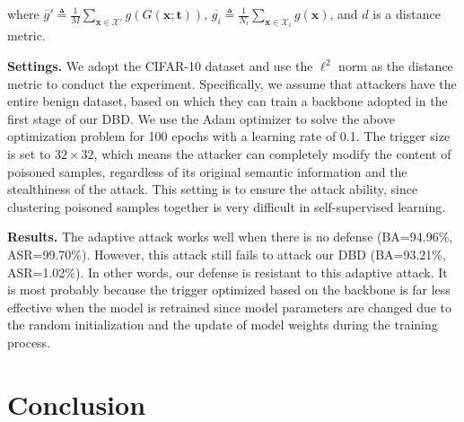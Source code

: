 where $\overline{g}' \triangleq \frac{1}{M}\sum_{\bm{x} \in \mathcal{X}'} g(G(\bm{x};\bm{t}))$, $\overline{g_i} \triangleq \frac{1}{N_i} \sum_{\bm{x} \in \mathcal{X}_i} g(\bm{x})$, and $d$ is a distance metric. 

\noindent \textbf{Settings.}
We adopt the CIFAR-10 dataset and use the $\ell^2$ norm as the distance metric to conduct the experiment. Specifically, we assume that attackers have the entire benign dataset, based on which they can train a backbone adopted in the first stage of our DBD. We use the Adam optimizer to solve the above optimization problem for 100 epochs with a learning rate of 0.1. The trigger size is set to $32\times32$, which means the attacker can completely modify the content of poisoned samples, regardless of its original semantic information and the stealthiness of the attack. This setting is to ensure the attack ability, since clustering poisoned samples together is very difficult in self-supervised learning.

\noindent \textbf{Results.}
The adaptive attack works well when there is no defense (BA=94.96\%, ASR=99.70\%). However, this attack still fails to attack our DBD (BA=93.21\%, ASR=1.02\%). In other words, our defense is resistant to this adaptive attack. It is most probably because the trigger optimized based on the backbone is far less effective when the model is retrained since model parameters are changed due to the random initialization and the update of model weights during the training process.


\vspace{-0.3em}
\section{Conclusion}
\vspace{-0.2em}

